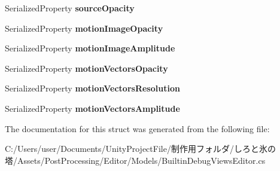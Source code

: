 \begin{DoxyCompactItemize}
\item 
\mbox{\label{struct_unity_editor_1_1_post_processing_1_1_builtin_debug_views_editor_1_1_motion_vectors_settings_a8bcac1aa6bde1fe3c2e51ebc11fbb0fd}} 
Serialized\+Property {\bfseries source\+Opacity}
\item 
\mbox{\label{struct_unity_editor_1_1_post_processing_1_1_builtin_debug_views_editor_1_1_motion_vectors_settings_ab285c612e0fe75ce159deb905fe9972e}} 
Serialized\+Property {\bfseries motion\+Image\+Opacity}
\item 
\mbox{\label{struct_unity_editor_1_1_post_processing_1_1_builtin_debug_views_editor_1_1_motion_vectors_settings_a025220caae31cf4c4ce9ed3301a45f98}} 
Serialized\+Property {\bfseries motion\+Image\+Amplitude}
\item 
\mbox{\label{struct_unity_editor_1_1_post_processing_1_1_builtin_debug_views_editor_1_1_motion_vectors_settings_a7a67f6687a4be588646a09d58d53ad07}} 
Serialized\+Property {\bfseries motion\+Vectors\+Opacity}
\item 
\mbox{\label{struct_unity_editor_1_1_post_processing_1_1_builtin_debug_views_editor_1_1_motion_vectors_settings_a6df7065d2fd7d6676578d144f16617f0}} 
Serialized\+Property {\bfseries motion\+Vectors\+Resolution}
\item 
\mbox{\label{struct_unity_editor_1_1_post_processing_1_1_builtin_debug_views_editor_1_1_motion_vectors_settings_a869ede32c22152229ad0b589040ec55d}} 
Serialized\+Property {\bfseries motion\+Vectors\+Amplitude}
\end{DoxyCompactItemize}


The documentation for this struct was generated from the following file\+:\begin{DoxyCompactItemize}
\item 
C\+:/\+Users/user/\+Documents/\+Unity\+Project\+File/制作用フォルダ/しろと氷の塔/\+Assets/\+Post\+Processing/\+Editor/\+Models/Builtin\+Debug\+Views\+Editor.\+cs\end{DoxyCompactItemize}
